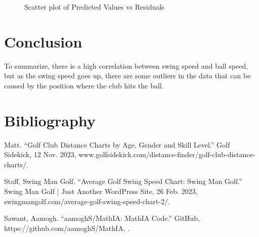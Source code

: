 \documentclass[12pt]{article}
\begin{document}
\begin{figure}[H] 
  \centering
  \caption{Scatter plot of Predicted Values vs Residuals}
\end{figure}

\section{Conclusion}
\hspace{1em} To summarize, there is a high correlation between swing speed and ball speed, but as the swing speed goes up, there are some outliers in the data that can be caused by the position where the club hits the ball.
\section{Bibliography}
Matt. “Golf Club Distance Charts by Age, Gender and Skill Level.” Golf Sidekick, 12 Nov. 2023, www.golfsidekick.com/distance-finder/golf-club-distance-charts/. 

Staff, Swing Man Golf. “Average Golf Swing Speed Chart: Swing Man Golf.” Swing Man Golf | Just Another WordPress Site, 26 Feb. 2023, swingmangolf.com/average-golf-swing-speed-chart-2/. 

Sawant, Aamogh. “aamoghS/MathIA: MathIA Code.” GitHub, https://github.com/aamoghS/MathIA. . 
\end{document}
